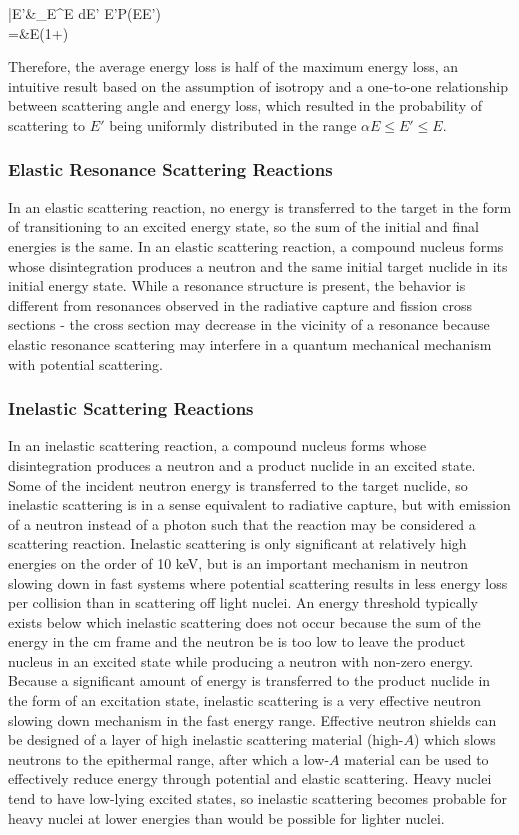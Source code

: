 \beqa
\bar{E'}\equiv&\int_{\alpha E}^E dE' E'P(E\rightarrow E')\\
=&E(1+\alpha)
\eeqa

Therefore, the average energy loss is half of the maximum energy loss, an intuitive result based on the assumption of isotropy and a one-to-one relationship between scattering angle and energy loss, which resulted in the probability of scattering to \(E'\) being uniformly distributed in the range \(\alpha E\leq E'\leq E\).

\subsubsection{Elastic Resonance Scattering Reactions}

In an elastic scattering reaction, no energy is transferred to the target in the form of transitioning to an excited energy state, so the sum of the initial and final energies is the same. In an elastic scattering reaction, a compound nucleus forms whose disintegration produces a neutron and the same initial target nuclide in its initial energy state. While a resonance structure is present, the behavior is different from resonances observed in the radiative capture and fission cross sections - the cross section may decrease in the vicinity of a resonance because elastic resonance scattering may interfere in a quantum mechanical mechanism with potential scattering.

\subsubsection{Inelastic Scattering Reactions}

In an inelastic scattering reaction, a compound nucleus forms whose disintegration produces a neutron and a product nuclide in an excited state. Some of the incident neutron energy is transferred to the target nuclide, so inelastic scattering is in a sense equivalent to radiative capture, but with emission of a neutron instead of a photon such that the reaction may be considered a scattering reaction. Inelastic scattering is only significant at relatively high energies on the order of 10 keV, but is an important mechanism in neutron slowing down in fast systems where potential scattering results in less energy loss per collision than in scattering off light nuclei. An energy threshold typically exists below which inelastic scattering does not occur because the sum of the energy in the \gls{cm} frame and the neutron \gls{be} is too low to leave the product nucleus in an excited state while producing a neutron with non-zero energy. Because a significant amount of energy is transferred to the product nuclide in the form of an excitation state, inelastic scattering is a very effective neutron slowing down mechanism in the fast energy range. Effective neutron shields can be designed of a layer of high inelastic scattering material (high-\(A\)) which slows neutrons to the epithermal range, after which a low-\(A\) material can be used to effectively reduce energy through potential and elastic scattering. Heavy nuclei tend to have low-lying excited states, so inelastic scattering becomes probable for heavy nuclei at lower energies than would be possible for lighter nuclei. 

